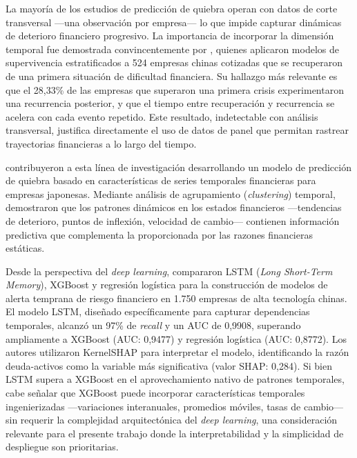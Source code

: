 \documentclass[12pt, letterpaper]{article}
\begin{document}
La mayor\'ia de los estudios de predicci\'on de quiebra operan con datos de corte transversal ---una observaci\'on por empresa--- lo que impide capturar din\'amicas de deterioro financiero progresivo. La importancia de incorporar la dimensi\'on temporal fue demostrada convincentemente por \citet{Zhou2022}, quienes aplicaron modelos de supervivencia estratificados a 524 empresas chinas cotizadas que se recuperaron de una primera situaci\'on de dificultad financiera. Su hallazgo m\'as relevante es que el 28,33\% de las empresas que superaron una primera crisis experimentaron una recurrencia posterior, y que el tiempo entre recuperaci\'on y recurrencia se acelera con cada evento repetido. Este resultado, indetectable con an\'alisis transversal, justifica directamente el uso de datos de panel que permitan rastrear trayectorias financieras a lo largo del tiempo.

\citet{Otsuki2022} contribuyeron a esta l\'inea de investigaci\'on desarrollando un modelo de predicci\'on de quiebra basado en caracter\'isticas de series temporales financieras para empresas japonesas. Mediante an\'alisis de agrupamiento (\textit{clustering}) temporal, demostraron que los patrones din\'amicos en los estados financieros ---tendencias de deterioro, puntos de inflexi\'on, velocidad de cambio--- contienen informaci\'on predictiva que complementa la proporcionada por las razones financieras est\'aticas.

Desde la perspectiva del \textit{deep learning}, \citet{Zhang2025} compararon LSTM (\textit{Long Short-Term Memory}), XGBoost y regresi\'on log\'istica para la construcci\'on de modelos de alerta temprana de riesgo financiero en 1.750 empresas de alta tecnolog\'ia chinas. El modelo LSTM, dise\~nado espec\'ificamente para capturar dependencias temporales, alcanz\'o un 97\% de \textit{recall} y un AUC de 0,9908, superando ampliamente a XGBoost (AUC: 0,9477) y regresi\'on log\'istica (AUC: 0,8772). Los autores utilizaron KernelSHAP para interpretar el modelo, identificando la raz\'on deuda-activos como la variable m\'as significativa (valor SHAP: 0,284). Si bien LSTM supera a XGBoost en el aprovechamiento nativo de patrones temporales, cabe se\~nalar que XGBoost puede incorporar caracter\'isticas temporales ingenierizadas ---variaciones interanuales, promedios m\'oviles, tasas de cambio--- sin requerir la complejidad arquitect\'onica del \textit{deep learning}, una consideraci\'on relevante para el presente trabajo donde la interpretabilidad y la simplicidad de despliegue son prioritarias.
\end{document}

